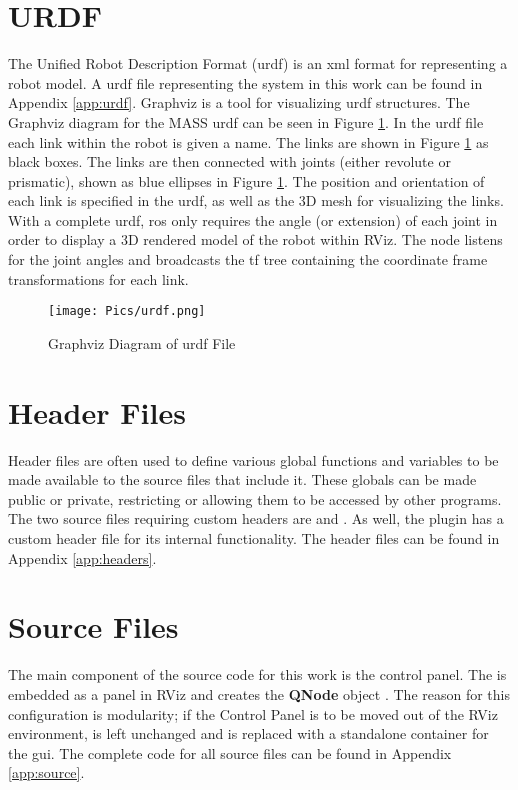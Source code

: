 \section{URDF}
The Unified Robot Description Format (\acrshort{urdf}) is an \acrshort{xml} format for representing a robot model. A \acrshort{urdf} file representing the system in this work can be found in Appendix \ref{app:urdf}. Graphviz is a tool for visualizing \acrshort{urdf} structures. The Graphviz diagram for the MASS \acrshort{urdf} can be seen in Figure \ref{fig:urdf}. In the \acrshort{urdf} file each link within the robot is given a name. The links are shown in Figure \ref{fig:urdf} as black boxes. The links are then connected with joints (either revolute or prismatic), shown as blue ellipses in Figure \ref{fig:urdf}. The position and orientation of each link is specified in the \acrshort{urdf}, as well as the 3D mesh for visualizing the links. With a complete \acrshort{urdf}, \acrshort{ros} only requires the angle (or extension) of each joint in order to display a 3D rendered model of the robot within RViz. The  node listens for the joint angles and broadcasts the tf tree containing the coordinate frame transformations for each link.\\

\begin{figure}[h]
    \centering
    \texttt{[image: Pics/urdf.png]}
    \caption{Graphviz Diagram of \acrshort{urdf} File}
    \label{fig:urdf}
\end{figure}

\section{Header Files}
Header files are often used to define various global functions and variables to be made available to the source files that include it. These globals can be made public or private, restricting or allowing them to be accessed by other programs. The two source files requiring custom headers are  and . As well, the  plugin has a custom header file for its internal functionality. The header files can be found in Appendix \ref{app:headers}.
\section{Source Files}
The main component of the source code for this work is the control panel. The  is embedded as a panel in RViz and creates the \textbf{QNode} object . The reason for this configuration is modularity; if the Control Panel is to be moved out of the RViz environment,  is left unchanged and  is replaced with a standalone container for the \acrshort{gui}. The complete code for all source files can be found in Appendix \ref{app:source}.
